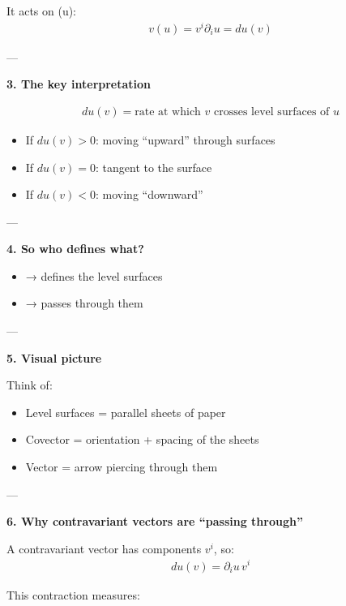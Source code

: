 \documentclass[12pt,a4paper]{report}
\begin{document}
\begin{description}
\begin{description}
It acts on (u):
\begin{align*}
v(u) = v^i \partial_i u = du(v)
\end{align*}

---

\item \textbf{3. The key interpretation}

\begin{align*}
\boxed{
du(v) = \text{rate at which } v \text{ crosses level surfaces of } u
}
\end{align*}

\begin{itemize}
\item If $du(v) > 0$: moving “upward” through surfaces
\item If $du(v) = 0$: tangent to the surface
\item If $du(v) < 0$: moving “downward”
\end{itemize}

---

\item \textbf{4. So who defines what?}

\begin{itemize}
\item {} → defines the level surfaces
\item {} → passes through them
\end{itemize}

---

\item \textbf{5. Visual picture}

Think of:

\begin{itemize}
\item Level surfaces = parallel sheets of paper
\item Covector = orientation + spacing of the sheets
\item Vector = arrow piercing through them
\end{itemize}

---

\item \textbf{6. Why contravariant vectors are “passing through”}

A contravariant vector has components $v^i$, so:
\begin{align*}
du(v) = \partial_i u \, v^i
\end{align*}

This contraction measures:


\end{description}
\end{description}
\end{document}

